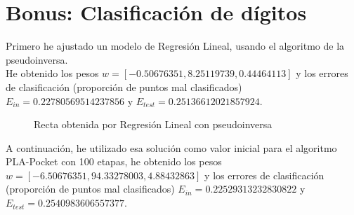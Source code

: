 \documentclass[a4]{article}
\begin{document}
\section{Bonus: Clasificación de dígitos}


Primero he ajustado un modelo de Regresión Lineal, usando el algoritmo
de la pseudoinversa. \\ He obtenido los pesos $w= [-0.50676351,  8.25119739,  0.44464113]$
 y los errores de clasificación (proporción de puntos mal clasificados) $E_{in}=0.22780569514237856$ y $E_{test} = 0.25136612021857924$.

\begin{figure}[H]
    \centering
    \caption{Recta obtenida por Regresión Lineal con pseudoinversa}
    \label{fig:lin-regress}
\end{figure}
\vspace{-3mm}

A continuación, he utilizado esa solución como valor inicial para
el algoritmo PLA-Pocket con 100 etapas, he obtenido los pesos $w= [-6.50676351, 94.33278003, 4.88432863]$
y los errores de clasificación (proporción de puntos mal clasificados)
$E_{in} = 0.22529313232830822$ y $E_{test} = 0.2540983606557377$.
\end{document}
